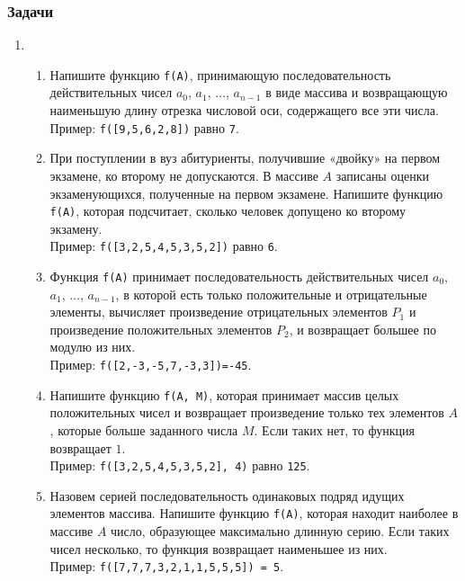 \documentclass{article}
\begin{document}
\subsubsection*{Задачи}
\begin{enumerate}[label={}, leftmargin=0pt, itemindent=0pt]
\item

\begin{enumerate}[label=\arabic{enumi}.\arabic*.]
\item 
Напишите функцию \texttt{f(A)}, принимающую последовательность действительных чисел $a_0$, $a_1$, $\ldots$, $a_{n-1}$ в виде массива и возвращающую наименьшую длину отрезка числовой оси, содержащего все эти числа.
\\Пример: \texttt{f([9,5,6,2,8])} равно \texttt{7}.

\item 
При поступлении в вуз абитуриенты, получившие «двойку» на первом экзамене, ко второму не допускаются. В массиве $A$ записаны оценки экзаменующихся, полученные на первом экзамене. Напишите функцию \texttt{f(A)}, которая подсчитает, сколько человек допущено ко второму экзамену.
\\Пример: \texttt{f([3,2,5,4,5,3,5,2])} равно \texttt{6}.

\item 
Функция \texttt{f(A)} принимает последовательность действительных чисел $a_0$, $a_1$, $\ldots$, $a_{n-1}$, в которой есть только положительные и отрицательные элементы, вычисляет произведение отрицательных элементов $P_1$ и произведение положительных элементов $P_2$, и возвращает большее по модулю из них.
\\Пример: \texttt{f([2,-3,-5,7,-3,3])=-45}. 

\item 
Напишите функцию \texttt{f(A, M)}, которая принимает массив целых положительных чисел и возвращает произведение только тех элементов $A$, которые больше заданного числа $M$. Если таких нет, то функция возвращает $1$.
\\Пример: \texttt{f([3,2,5,4,5,3,5,2],\,4)} равно \texttt{125}.

\item 
Назовем серией последовательность одинаковых подряд идущих элементов массива. 
Напишите функцию \texttt{f(A)}, которая находит наиболее в массиве $A$ число, образующее максимально длинную серию. Если таких чисел несколько, то функция возвращает наименьшее из них.
\\Пример: \texttt{f([7,7,7,3,2,1,1,5,5,5]) = 5}.


\end{enumerate}
\end{enumerate}
\end{document}
